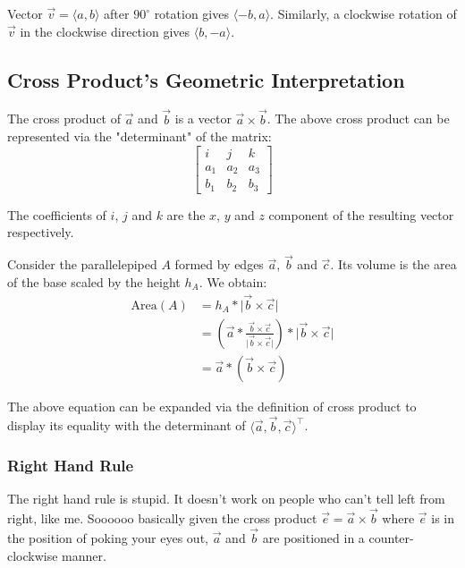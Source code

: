 \documentclass[12pt]{article}
\newcommand{\mo}[1]{\lvert #1 \rvert}
\newcommand{\iv}[1]{\langle #1 \rangle}
\theoremstyle{definition}
\begin{document}
	Vector $\vec{v} = \iv{a, b}$ after $90^\circ$ rotation gives $\iv{-b, a}$. Similarly, a clockwise rotation of $\vec{v}$ in the clockwise direction gives $\iv{b, -a}$.
	
	\subsection{Cross Product's Geometric Interpretation}
	
	The cross product of $\vec{a}$ and $\vec{b}$ is a vector $\vec{a} \times \vec{b}$. The above cross product can be represented via the "determinant" of the matrix:
	\begin{equation*}
	\begin{bmatrix}
		i & j & k \\ a_1 & a_2 & a_3 \\ b_1 & b_2 & b_3
	\end{bmatrix}
	\end{equation*}
	
	The coefficients of $i$, $j$ and $k$ are the $x$, $y$ and $z$ component of the resulting vector respectively.
	
	Consider the parallelepiped $A$ formed by edges $\vec{a}$, $\vec{b}$ and $\vec{c}$. Its volume is the area of the base scaled by the height $h_A$. We obtain:
	\begin{align*}
		\text{Area}(A) &= h_A * \mo{\vec{b} \times \vec{c}} \\
		&= \left(\vec{a} * \frac{\vec{b} \times \vec{c}}{\mo{\vec{b} \times \vec{c}}}\right) * \mo{\vec{b} \times \vec{c}} \\
		&= \vec{a} * (\vec{b} \times \vec{c})
	\end{align*}
	
	The above equation can be expanded via the definition of cross product to display its equality with the determinant of $\iv{\vec{a}, \vec{b}, \vec{c}}^\top$.
	
	\subsubsection{Right Hand Rule}
	
	The right hand rule is stupid. It doesn't work on people who can't tell left from right, like me. Soooooo basically given the cross product $\vec{e} = \vec{a} \times \vec{b}$ where $\vec{e}$ is in the position of poking your eyes out, $\vec{a}$ and $\vec{b}$ are positioned in a counter-clockwise manner.
	
\end{document}
